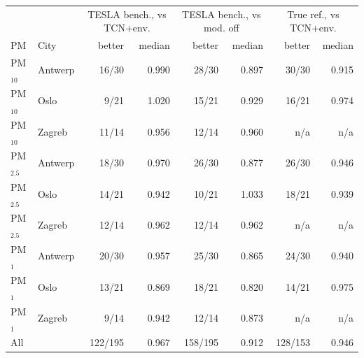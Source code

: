 \begin{tabular}{llrrrrrr}
\toprule
 & & \multicolumn{2}{c}{TESLA bench., vs TCN+env.} & \multicolumn{2}{c}{TESLA bench., vs mod. off} & \multicolumn{2}{c}{True ref., vs TCN+env.} \\
PM & City & better & median & better & median & better & median \\
\midrule
PM$_{10}$ & Antwerp & 16/30 & 0.990 & 28/30 & 0.897 & 30/30 & 0.915 \\
PM$_{10}$ & Oslo & 9/21 & 1.020 & 15/21 & 0.929 & 16/21 & 0.974 \\
PM$_{10}$ & Zagreb & 11/14 & 0.956 & 12/14 & 0.960 & n/a & n/a \\
PM$_{2.5}$ & Antwerp & 18/30 & 0.970 & 26/30 & 0.877 & 26/30 & 0.946 \\
PM$_{2.5}$ & Oslo & 14/21 & 0.942 & 10/21 & 1.033 & 18/21 & 0.939 \\
PM$_{2.5}$ & Zagreb & 12/14 & 0.962 & 12/14 & 0.962 & n/a & n/a \\
PM$_{1}$ & Antwerp & 20/30 & 0.957 & 25/30 & 0.865 & 24/30 & 0.940 \\
PM$_{1}$ & Oslo & 13/21 & 0.869 & 18/21 & 0.820 & 14/21 & 0.975 \\
PM$_{1}$ & Zagreb & 9/14 & 0.942 & 12/14 & 0.873 & n/a & n/a \\
\midrule
All & & 122/195 & 0.967 & 158/195 & 0.912 & 128/153 & 0.946 \\
\bottomrule
\end{tabular}
